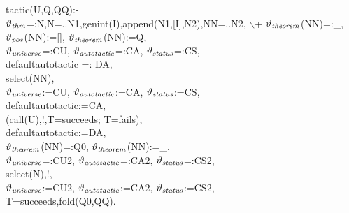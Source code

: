 \documentclass[11pt]{report}
\makeatletter
\newcommand{\ulinv}[1]{\index{#1@\texttt{#1}}}
\makeatother
\begin{document}
\begin{itemize}
 \small
 \ulinv{tactic}
\begin{sf}\begin{tabbing}
tactic(U,Q,QQ):-\\[-0.15ex]
\hspace{1em}$\vartheta_{\it thm}$=:N,N=..N1,genint(I),append(N1,[I],N2),NN=..N2, $\backslash$+ $\vartheta_{\it theorem}$(NN)=:\_\hspace{0.1em}, \\[-0.15ex]
\hspace{1em}$\vartheta_{\it pos}$(NN):=[], $\vartheta_{\it theorem}$(NN):=Q, \\[-0.15ex]
\hspace{1em}$\vartheta_{\it universe}$=:CU, $\vartheta_{\it autotactic}$=:CA, $\vartheta_{\it status}$=:CS,\\[-0.15ex]
\hspace{1em}defaultautotactic =: DA,\\[-0.15ex]
\hspace{1em}select(NN),\\[-0.15ex]
\hspace{1em}$\vartheta_{\it universe}$:=CU, $\vartheta_{\it autotactic}$:=CA, $\vartheta_{\it status}$:=CS,\\[-0.15ex]
\hspace{1em}defaultautotactic:=CA,\\[-0.15ex]
\hspace{1em}(call(U),!,T=succeeds; T=fails),\\[-0.15ex]
\hspace{1em}defaultautotactic:=DA,\\[-0.15ex]
\hspace{1em}$\vartheta_{\it theorem}$(NN)=:Q0, $\vartheta_{\it theorem}$(NN):=\_\hspace{0.1em},\\[-0.15ex]
\hspace{1em}$\vartheta_{\it universe}$=:CU2, $\vartheta_{\it autotactic}$=:CA2, $\vartheta_{\it status}$=:CS2,\\[-0.15ex]
\hspace{1em}select(N),!,\\[-0.15ex]
\hspace{1em}$\vartheta_{\it universe}$:=CU2, $\vartheta_{\it autotactic}$:=CA2, $\vartheta_{\it status}$:=CS2,\\[-0.15ex]
\hspace{1em}T=succeeds,fold(Q0,QQ).\\[-0.7ex]

\end{tabbing}\end{sf}


\end{itemize}
\end{document}
